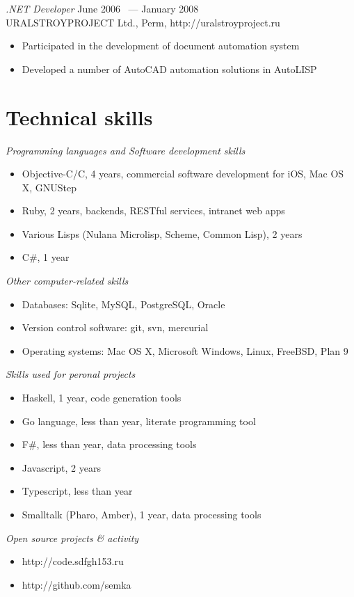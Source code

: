 \documentclass[12pt]{res}
\begin{document}
\begin{resume}
{\sl .NET Developer} \hfill June 2006 ~--- January 2008 \\
URALSTROYPROJECT Ltd., Perm, http://uralstroyproject.ru
\begin{itemize}
\item Participated in the development of document automation system
\item Developed a number of AutoCAD automation solutions in AutoLISP
\end{itemize}

\section{Technical skills} 

{\sl Programming languages and Software development skills} 
\begin{itemize}
\item Objective-C/C, 4 years, commercial software development for iOS, Mac OS X, GNUStep
\item Ruby, 2 years, backends, RESTful services, intranet web apps
\item Various Lisps (Nulana Microlisp, Scheme, Common Lisp), 2 years
\item C\#, 1 year
\end{itemize}

{\sl Other computer-related skills}
\begin{itemize}
\item Databases: Sqlite, MySQL, PostgreSQL, Oracle
\item Version control software: git, svn, mercurial
\item Operating systems: Mac OS X, Microsoft Windows, Linux, FreeBSD, Plan 9
\end{itemize} 

{\sl Skills used for peronal projects}
\begin{itemize}
\item Haskell, 1 year, code generation tools
\item Go language, less than year, literate programming tool
\item F\#, less than year, data processing tools
\item Javascript, 2 years
\item Typescript, less than year
\item Smalltalk (Pharo, Amber), 1 year, data processing tools
\end{itemize}

{\sl Open source projects \& activity}
\begin{itemize}
\item http://code.sdfgh153.ru
\item http://github.com/semka
\end{itemize}


\end{resume}
\end{document}
